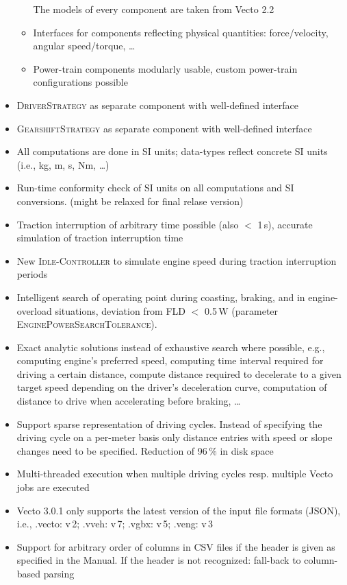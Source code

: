 \begin{itemize}
\begin{itemize}
		The models of every component are taken from Vecto 2.2
		\item Interfaces for components reflecting physical quantities:
		force/velocity, angular speed/torque, \ldots
		\item Power-train components modularly usable, custom power-train configurations possible
	\end{itemize}
	\item \textsc{DriverStrategy} as separate component with well-defined interface
	\item \textsc{GearshiftStrategy} as separate component with well-defined interface
	\item All computations are done in SI units; data-types reflect concrete SI units (i.e., kg, m, s, Nm, \ldots)
	\item Run-time conformity check of SI units on all computations and SI conversions. (might be relaxed for final relase version)
	\item Traction interruption of arbitrary time possible (also $<$ 1\,s), accurate simulation of traction interruption time
	\item New \textsc{Idle-Controller} to simulate engine speed during traction interruption periods
	\item Intelligent search of operating point during coasting, braking, and in engine-overload situations, deviation from FLD $<$ 0.5\,W (parameter \textsc{EnginePowerSearchTolerance}).
	\item Exact analytic solutions instead of exhaustive search where possible, e.g., computing engine's preferred speed, computing time interval required for driving a certain distance, compute distance required to decelerate to a given target speed depending on the driver's deceleration curve, computation of distance to drive when accelerating before braking, \ldots
	\item Support sparse representation of driving cycles. Instead of specifying the driving cycle on a per-meter basis only distance entries with speed or slope changes need to be specified. Reduction of 96\,\% in disk space
	\item Multi-threaded execution when multiple driving cycles resp. multiple Vecto jobs are executed
	\item Vecto 3.0.1 only supports the latest version of the input file formats (JSON), i.e., .vecto: v\,2; .vveh: v\,7; .vgbx: v\,5; .veng: v\,3
	\item Support for arbitrary order of columns in CSV files if the header is given as specified in the Manual. If the header is not recognized: fall-back to column-based parsing

\end{itemize}

